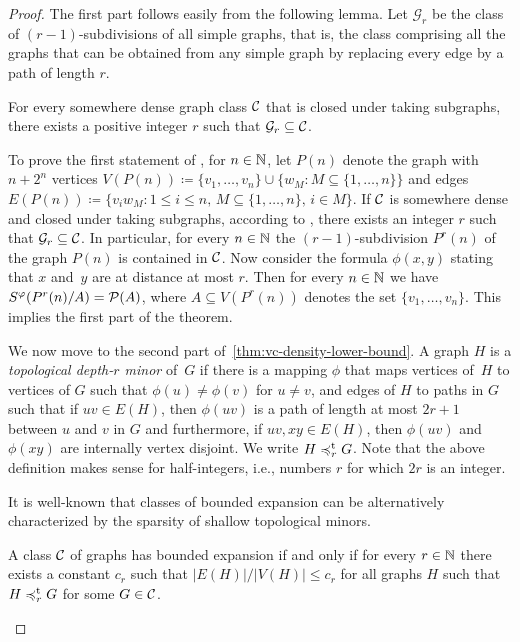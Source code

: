 \begin{proof}
The first part follows easily from the following lemma.
Let $\mathcal{G}_r$ be the class of $(r-1)$-subdivisions of all 
simple graphs, that is, the class comprising
all the graphs that can be obtained from any simple graph by replacing every edge by a path of
length $r$.

\begin{lemma}\label{lem:lower-nd}
For every somewhere dense graph class $\mathcal{C}$ that is closed 
under taking subgraphs, there
exists a positive integer $r$ such that $\mathcal{G}_{r}\subseteq \mathcal{C}$.
\end{lemma}

To prove the first statement of , 
for $n\in \mathbb{N}$, let $P(n)$ denote the graph with $n+2^n$ 
vertices $V(P(n))\coloneqq \{v_1,\ldots, v_n\}\cup \{w_M \colon M\subseteq \{1,\ldots, n\}\}$ and edges $E(P(n))\coloneqq \{v_iw_M \colon 1\leq i\leq n,\, M\subseteq \{1,\ldots, n\},\, i\in M\}$. 
If $\mathcal{C}$ is somewhere dense and closed under taking subgraphs, 
according to , there exists an integer $r$ 
such that $\mathcal{G}_{r}\subseteq \mathcal{C}$. In particular, for every $n\in \mathbb{N}$ the $(r-1)$-subdivision $P^{r}(n)$ of the graph $P(n)$ is contained in $\mathcal{C}$.
Now consider 
the formula $\phi(x,y)$ stating that $x$ and~$y$ are at distance at most $r$. Then for every $n\in \mathbb{N}$ we have 
$S^\varphi(P^{r}(n)/A)=\mathcal{P}(A)$, where $A\subseteq V(P^{r}(n))$ denotes the set $\{v_1,\ldots, v_n\}$. This implies the first part
of the theorem. 

\medskip
We now move to the  second part of~\cref{thm:vc-density-lower-bound}.
A graph $H$ is a \emph{topological depth-$r$ minor} of~$G$ if
there is a mapping $\phi$ that maps vertices of~$H$ to 
vertices of $G$ such that $\phi(u)\neq \phi(v)$ for 
$u\neq v$, and edges of $H$ to paths in 
$G$ such that if $uv\in E(H)$, then $\phi(uv)$
is a path of length at most $2r+1$ between $u$ and $v$ in 
$G$ and furthermore, if $uv, xy\in E(H)$, then 
$\phi(uv)$ and $\phi(xy)$ are internally vertex
disjoint. We write $H\preccurlyeq_r^{\mathrm{t}} G$. 
Note that the above definition makes sense for 
half-integers, i.e., numbers $r$ for which $2r$ is an integer.

It is well-known that classes of bounded expansion can be alternatively characterized by the sparsity of shallow topological minors.

\begin{lemma}\label{lem:top-bnd-exp}
A class $\mathcal{C}$ of graphs has bounded expansion if and only 
if for every $r\in \mathbb{N}$ there exists a constant $c_r$ such that $|E(H)|/|V(H)|\leq c_r$ for all graphs $H$ such that $H\preccurlyeq_r^{\mathrm{t}} G $ for some $G\in \mathcal{C}$.
\end{lemma}


\end{proof}
